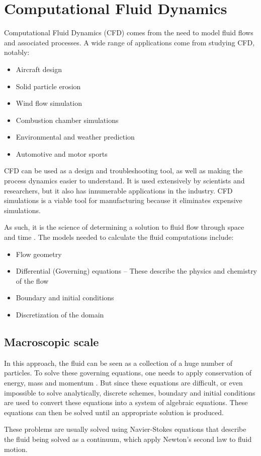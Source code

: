 \documentclass[12pt, openany]{book}
\begin{document}
\section{Computational Fluid Dynamics}
Computational Fluid Dynamics (CFD) comes from the need to model fluid flows and associated processes.
A wide range of applications come from studying CFD, notably:
\begin{itemize}
\item Aircraft design \cite{aircraft_cfd}
\item Solid particle erosion \cite{partic_erosion_cfd}
\item Wind flow simulation \cite{wind_flow_cfd}
\item Combustion chamber simulations \cite{combust_cfd}
\item Environmental and weather prediction \cite{weather_pred}
\item Automotive and motor sports \cite{america_cup,race_car_wing}
\end{itemize}

CFD can be used as a design and troubleshooting tool, as well as making the process dynamics easier to understand. It is used extensively by scientists and researchers, but it also has innumerable applications in the industry. CFD simulations is a viable tool for manufacturing because it eliminates expensive simulations.\par
 As such, it is the science of determining a solution to fluid flow through space and time \cite{cfd_present}. The models needed to calculate the fluid computations include:
\begin{itemize}
\item	Flow geometry
\item	Differential (Governing) equations – These describe the physics and chemistry of the flow
\item Boundary and initial conditions
\item	Discretization of the domain
\end{itemize}



\subsection{Macroscopic scale}
In this approach, the fluid can be seen as a collection of a huge number of particles. To solve these governing equations, one needs to apply conservation of energy, mass and momentum \cite{lbm_springer}. But since these equations are difficult, or even impossible to solve analytically, discrete schemes, boundary and initial conditions are used to convert these equations into a system of algebraic equations. These equations can then be solved until an appropriate solution is produced. 
\par These problems are usually solved using Navier-Stokes equations that describe the fluid being solved as a continuum, which apply Newton's second law to fluid motion.
\end{document}
